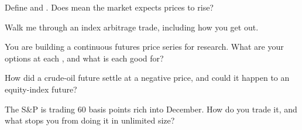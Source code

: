 \begin{interviewq}\label{iq:m1:basis-roll-and-delivery:2}
Define  and . Does  mean the market expects
prices to rise?
\end{interviewq}

\begin{interviewq}\label{iq:m1:basis-roll-and-delivery:3}
Walk me through an index arbitrage trade, including how you get out.
\end{interviewq}

\begin{interviewq}\label{iq:m1:basis-roll-and-delivery:4}
You are building a continuous futures price series for research. What are
your options at each , and what is each good for?
\end{interviewq}

\begin{interviewq}\label{iq:m1:basis-roll-and-delivery:5}
How did a crude-oil future settle at a negative price, and could it happen
to an equity-index future?
\end{interviewq}

\begin{interviewq}\label{iq:m1:basis-roll-and-delivery:6}
The S\&P  is trading 60 basis points rich into December. How do you
trade it, and what stops you from doing it in unlimited size?
\end{interviewq}
